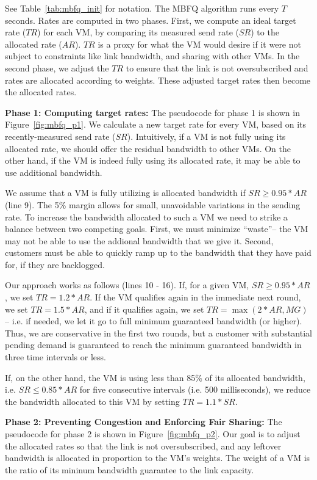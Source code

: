 See Table~\ref{tab:mbfq_init} for notation.  The MBFQ algorithm runs every $T$
seconds. Rates are computed in two phases.  First, we compute an ideal target
rate ($TR$) for each VM, by comparing its measured send rate ($SR$) to the
allocated rate ($AR$). $TR$ is a proxy for what the VM would desire if it were
not subject to constraints like link bandwidth, and sharing with other VMs.  In
the second phase, we adjust the $TR$ to ensure that the link is not
oversubscribed and rates are allocated according to weights. These adjusted
target rates then become the allocated rates.

{\bf Phase 1: Computing target rates:} 
The pseudocode for phase 1 is shown in Figure~\ref{fig:mbfq_p1}. We calculate
a new target rate for every VM, based on its recently-measured send rate ($SR$).
Intuitively, if a VM is not fully using its allocated rate, we should offer the
residual bandwidth to other VMs.  On the other hand, if the VM is indeed fully
using its allocated rate, it may be able to use additional bandwidth. 

We assume that a VM is fully utilizing is allocated bandwidth if $SR \geq
0.95*AR$ (line 9). The 5\% margin allows for small, unavoidable variations in
the sending rate. To increase the bandwidth allocated to such a VM we need to
strike a balance between two competing goals. First, we must minimize
``waste''-- the VM may not be able to use the addional bandwidth that we give
it.  Second, customers must be able to quickly ramp up to the bandwidth that
they have paid for, if they are backlogged.

Our approach works as follows (lines 10 - 16).  If, for a given VM, $SR \geq
0.95*AR$, we set $TR = 1.2*AR$.  If the VM qualifies again in the immediate next
round, we set $TR = 1.5*AR$, and if it qualifies again, we set $TR = \max(2*AR,
MG)$ -- i.e.  if needed, we let it go to full minimum guaranteed bandwidth (or
higher).  Thus, we are conservative in the first two rounds, but a customer with
substantial pending demand is guaranteed to reach the minimum guaranteed
bandwidth in three time intervals or less.

If, on the other hand, the VM is using less than 85\% of its allocated
bandwidth, i.e. $SR \leq 0.85*AR$ for five consecutive intervals (i.e. 500 milliseconds),
we reduce the bandwidth allocated to this VM by setting $TR = 1.1*SR$. 

{\bf Phase 2:  Preventing Congestion and Enforcing Fair Sharing:} The pseudocode
for phase 2 is shown in Figure~\ref{fig:mbfq_p2}. Our goal is to adjust the
allocated rates so that the link is not oversubscribed, and any leftover bandwidth
is allocated in proportion to the VM's weights.  The weight of a VM is the ratio of
its mininum bandwidth guarantee to the link capacity.

